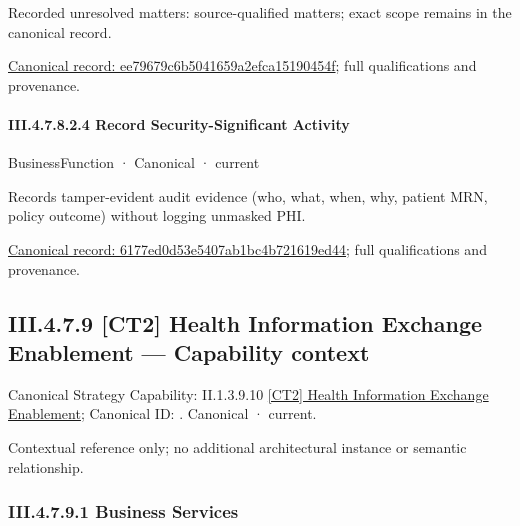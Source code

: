 {\small Recorded unresolved matters: source-qualified matters; exact scope remains in the canonical record.}\par
{\footnotesize \href{../../../../continuum/business/business-function/ee79679c6b5041659a2efca15190454f.md}{Canonical record: ee79679c6b5041659a2efca15190454f}; full qualifications and provenance.}\par
\paragraph*{III.4.7.8.2.4 Record Security-Significant Activity}
\label{navigation:III.4.7.8.2.4}

\label{element:6177ed0d53e5407ab1bc4b721619ed44}
{\small BusinessFunction · Canonical · current}\par

Records tamper-evident audit evidence (who, what, when, why, patient MRN, policy outcome) without logging unmasked PHI.


{\footnotesize \href{../../../../continuum/business/business-function/6177ed0d53e5407ab1bc4b721619ed44.md}{Canonical record: 6177ed0d53e5407ab1bc4b721619ed44}; full qualifications and provenance.}\par
\subsection*{III.4.7.9 [CT2] Health Information Exchange Enablement — Capability context}
\label{navigation:III.4.7.9}

{\small Canonical Strategy Capability: II.1.3.9.10 \hyperref[element:a61a15908ed544e6acf3e9cab63a0267]{[CT2] Health Information Exchange Enablement}; Canonical ID: \texttt{}. Canonical · current.}\par
Contextual reference only; no additional architectural instance or semantic relationship.\par
\subsubsection*{III.4.7.9.1 Business Services}
\label{navigation:III.4.7.9.1}

